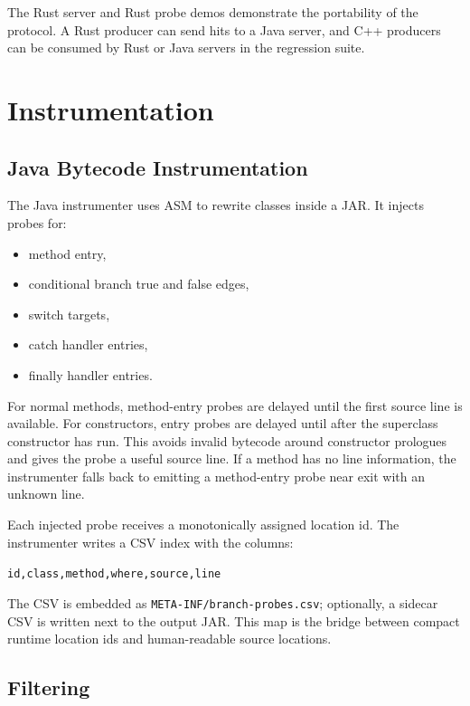 \documentclass[11pt]{article}
\newcommand{\code}[1]{\texttt{#1}}
\begin{document}
The Rust server and Rust probe demos demonstrate the portability of the
protocol. A Rust producer can send hits to a Java server, and C++ producers can
be consumed by Rust or Java servers in the regression suite.

\section{Instrumentation}

\subsection{Java Bytecode Instrumentation}

The Java instrumenter uses ASM to rewrite classes inside a JAR. It injects
probes for:

\begin{itemize}
  \item method entry,
  \item conditional branch true and false edges,
  \item switch targets,
  \item catch handler entries,
  \item finally handler entries.
\end{itemize}

For normal methods, method-entry probes are delayed until the first source line
is available. For constructors, entry probes are delayed until after the
superclass constructor has run. This avoids invalid bytecode around constructor
prologues and gives the probe a useful source line. If a method has no line
information, the instrumenter falls back to emitting a method-entry probe near
exit with an unknown line.

Each injected probe receives a monotonically assigned location id. The
instrumenter writes a CSV index with the columns:

\begin{center}
\code{id,class,method,where,source,line}
\end{center}

The CSV is embedded as \code{META-INF/branch-probes.csv}; optionally, a sidecar
CSV is written next to the output JAR. This map is the bridge between compact
runtime location ids and human-readable source locations.

\subsection{Filtering}
\end{document}
